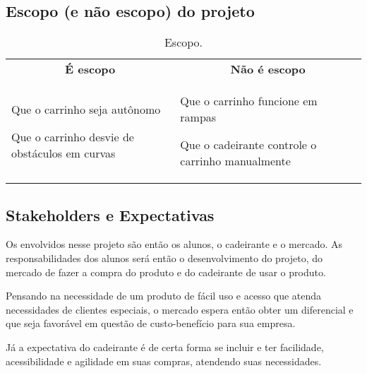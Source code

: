 \begin{apendicesenv}
\subsection{Escopo (e não escopo) do projeto}
\begin{table}[h]
 \centering
 {\renewcommand\arraystretch{1.25}
 \caption{Escopo.}
 \begin{tabular}{ l l }
  \cline{1-1}\cline{2-2}  
    \multicolumn{1}{|c|}{\textbf{É escopo} \centering } &
    \multicolumn{1}{c|}{\textbf{Não é escopo} \centering }
  \\  
  \cline{1-1}\cline{2-2}  
    \multicolumn{1}{|p{3.850cm}|}{\begin{center}Que o carrinho seja autônomo
\end{center}  			


\begin{center}Que o carrinho desvie de obstáculos em curvas
\end{center}} &
    \multicolumn{1}{p{4.217cm}|}{\begin{center}Que o carrinho funcione em rampas
\end{center}  			


\begin{center}Que o cadeirante controle o carrinho manualmente
\end{center}}
  \\  
  \hline

 \end{tabular} }
\end{table}

\subsection{Stakeholders e Expectativas}

Os envolvidos nesse projeto são então os alunos, o cadeirante e o mercado. As responsabilidades dos alunos será então o desenvolvimento do projeto, do mercado de fazer a compra do produto e do cadeirante de usar o produto.

\par Pensando na necessidade de um produto de fácil uso e acesso que atenda necessidades de clientes especiais, o mercado espera então obter um diferencial e que seja favorável em questão de custo-benefício para sua empresa.

\par Já a expectativa do cadeirante é de certa forma se incluir e ter facilidade, acessibilidade e agilidade em suas compras, atendendo suas necessidades.


\end{apendicesenv}
